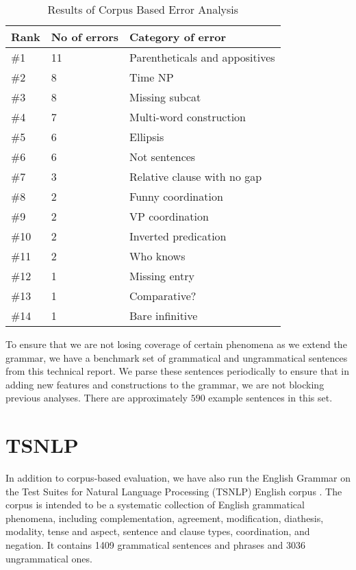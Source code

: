 \begin{table}[htb]
\centering
\begin{tabular}{|l|l|l|} \hline
Rank & No of errors & Category of error \\ \hline
\#1  & 11  &    Parentheticals and appositives \\ \hline
\#2  & 8     &  Time NP \\ \hline
\#3  & 8  &     Missing subcat \\ \hline
\#4  & 7 &      Multi-word construction \\ \hline
\#5  & 6 &       Ellipsis \\ \hline
\#6  & 6  &      Not sentences \\ \hline
\#7  & 3  &      Relative clause with no gap \\ \hline
\#8  & 2  &      Funny coordination \\ \hline
\#9  & 2  &      VP coordination \\ \hline
\#10  & 2  &      Inverted predication \\ \hline
\#11  & 2  &      Who knows \\ \hline
\#12  & 1  &      Missing entry \\ \hline
\#13  & 1   &     Comparative? \\ \hline
\#14  & 1    &    Bare infinitive \\ \hline
\end{tabular}
\caption{Results of Corpus Based Error Analysis}
\label{errors}
\end{table}

To ensure that we are not losing coverage of certain phenomena as we
extend the grammar, we have a benchmark set of grammatical and
ungrammatical sentences from this technical report. We parse these
sentences periodically to ensure that in adding new features and
constructions to the grammar, we are not blocking previous analyses.
There are approximately $590$ example sentences in this set.

\section{TSNLP}

In addition to corpus-based evaluation, we have also run the English
Grammar on the Test Suites for Natural Language Processing (TSNLP)
English corpus \cite{Lehmann96}. The corpus is intended to be a
systematic collection of English grammatical phenomena, including
complementation, agreement, modification, diathesis, modality, tense
and aspect, sentence and clause types, coordination, and negation. It
contains 1409 grammatical sentences and phrases and 3036 ungrammatical
ones.

